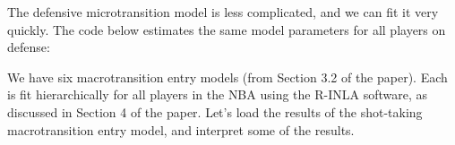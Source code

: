 \documentclass{article}\usepackage[]{graphicx}\usepackage[]{color}
\makeatletter
\newcommand{\hlnum}[1]{\textcolor[rgb]{0.686,0.059,0.569}{#1}}%
\newcommand{\hlcom}[1]{\textcolor[rgb]{0.678,0.584,0.686}{\textit{#1}}}%
\newcommand{\hlopt}[1]{\textcolor[rgb]{0,0,0}{#1}}%
\newcommand{\hlstd}[1]{\textcolor[rgb]{0.345,0.345,0.345}{#1}}%
\newcommand{\hlkwb}[1]{\textcolor[rgb]{0.69,0.353,0.396}{#1}}%
\newcommand{\hlkwd}[1]{\textcolor[rgb]{0.737,0.353,0.396}{\textbf{#1}}}%
\newenvironment{kframe}{%
 \def\at@end@of@kframe{}%
 \ifinner\ifhmode%
  \def\at@end@of@kframe{\end{minipage}}%
  \begin{minipage}{\columnwidth}%
 \fi\fi%
 \def\FrameCommand##1{\hskip\@totalleftmargin \hskip-\fboxsep
 \colorbox{shadecolor}{##1}\hskip-\fboxsep
     \hskip-\linewidth \hskip-\@totalleftmargin \hskip\columnwidth}%
 \MakeFramed {\advance\hsize-\width
   \@totalleftmargin\z@ \linewidth\hsize
   \@setminipage}}%
 {\par\unskip\endMakeFramed%
 \at@end@of@kframe}
\makeatother
\begin{document}
The defensive microtransition model is less complicated, and we can fit it very quickly. The code below estimates the same model parameters for all players on defense:



We have six macrotransition entry models (from Section 3.2 of the paper). Each is fit hierarchically for all players in the NBA using the R-INLA software, as discussed in Section 4 of the paper. Let's load the results of the shot-taking macrotransition entry model, and interpret some of the results. 
\end{document}
